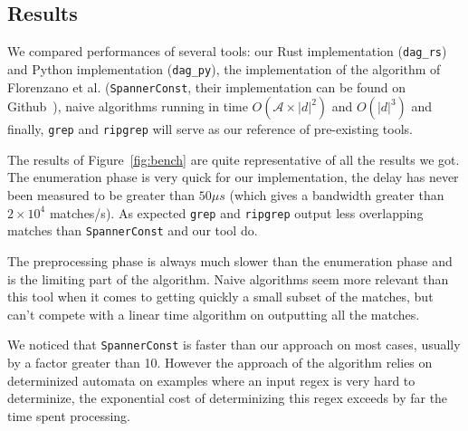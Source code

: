 \documentclass[11px]{article}
\theoremstyle{definition}
\newcommand{\pierre}[1]{\textcolor{magenta}{[\textbf{Pierre:} #1]}}
\begin{document}
    \subsection{Results}

      We compared performances of several tools: our Rust implementation
      (\texttt{dag\_rs}) and Python implementation (\texttt{dag\_py}), the
      implementation of the algorithm of Florenzano et al.
      (\texttt{SpannerConst}, their implementation can be found on
      Github~\cite{implSpannersConst}), naive algorithms running in time
      $O(\mathcal{A} \times |d|^2)$ and $O(|d|^3)$  and finally, \texttt{grep}
      and \texttt{ripgrep} will serve as our reference of pre-existing tools.

      The results of Figure~\ref{fig:bench} are quite representative of all the
      results we got. The enumeration phase is very quick for our
      implementation, the delay has never been measured to be greater than $50
      \mu s$ (which gives a bandwidth greater than $2 \times 10^4$ matches/s).
      As expected \texttt{grep} and \texttt{ripgrep} output less overlapping
      matches than \texttt{SpannerConst} and our tool do.

      The preprocessing phase is always much slower than the enumeration phase
      and is the limiting part of the algorithm. Naive algorithms seem more
      relevant than this tool when it comes to getting quickly a small subset
      of the matches, but can't compete with a linear time algorithm on
      outputting all the matches.

      We noticed that \texttt{SpannerConst} is faster than our approach on most
      cases, usually by a factor greater than 10. However the approach of the
      algorithm relies on determinized automata on examples where an input
      regex is very hard to determinize, the exponential cost of determinizing
      this regex exceeds by far the time spent processing.
\end{document}
